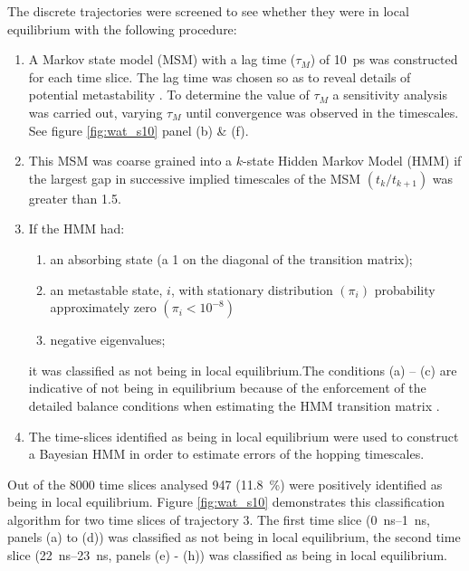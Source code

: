 The discrete trajectories were screened to see whether they were in local equilibrium with the following procedure:
\begin{enumerate}
    \item A Markov state model (MSM) with a lag time ($\tau_{M}$) of \SI{10}{\pico\second} was constructed for each time slice. The lag time was chosen so as to reveal details of potential metastability \cite{prinzMarkovModelsMolecular2011}. To determine the value of $\tau_{M}$  a sensitivity analysis was carried out, varying $\tau_{M}$ until convergence was observed  in the timescales. See figure \ref{fig:wat_s10} panel (b) \& (f).
    \item This MSM was coarse grained into a $k$-state Hidden Markov Model (HMM) if the largest gap in successive implied timescales of the MSM $\left(t_{k} / t_{k+1}\right)$ was greater than \num{1.5}. 
    \item If the HMM had:
    \begin{enumerate}
        \item an absorbing state (a \num{1} on the diagonal of the transition matrix);
        \item an metastable state, $i$, with stationary distribution $\left(\pi_{i}\right)$ probability approximately zero $\left(\pi_{i}< 10^{-8}\right)$
        \item negative eigenvalues; 
    \end{enumerate}
    it was classified as not being in local equilibrium.The conditions (a) – (c) are indicative of not being in equilibrium because of the enforcement of the detailed balance conditions when estimating the HMM transition matrix \cite{noeProjectedHiddenMarkov2013a}.
    \item The time-slices identified as being in local equilibrium were used to construct a Bayesian HMM in order to estimate errors of the hopping timescales. 
\end{enumerate}

Out of the \num{8000} time slices analysed \num{947} (\SI{11.8}{\percent}) were positively identified as being in local equilibrium. Figure \ref{fig:wat_s10} demonstrates this classification algorithm for two time slices of trajectory \num{3}. The first time slice (\SIrange{0}{1}{\nano\second}, panels (a) to (d)) was classified as not being in local equilibrium, the second time slice (\SIrange{22}{23}{\nano\second}, panels (e) - (h)) was classified as being in local equilibrium.

